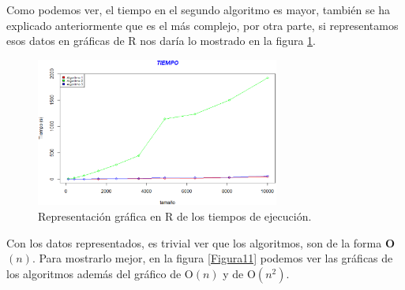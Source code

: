 \begin{table}[h!]
\begin{center}
\end{center}
\caption{Tiempo de ejecución (s) de los algoritmos para los distintas divisiones.} \label{Tabla5}
\end{table}


Como podemos ver, el tiempo en el segundo algoritmo es mayor, también se ha explicado anteriormente que es el más complejo, por otra parte, si representamos esos datos en gráficas de R nos daría lo mostrado en la figura \ref{Figura10}.

\begin{figure}[h!]

	\centering
	\includegraphics[width=8cm]{./eps/tiempo.eps}
	\caption{Representación gráfica en R de los tiempos de ejecución.}
	\label{Figura10}

\end{figure}

Con los datos representados, es trivial ver que los algoritmos, son de la forma \textbf{O$(n)$}. Para mostrarlo mejor, en la figura \ref{Figura11} podemos ver las gráficas de los algoritmos además del gráfico de O$(n)$ y de O$(n^2)$.

